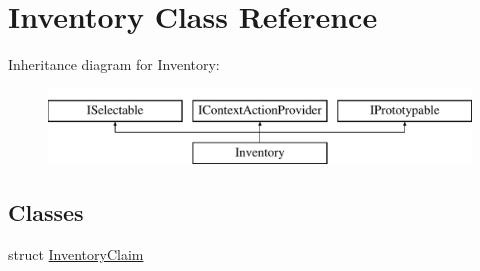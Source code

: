 \hypertarget{class_inventory}{}\section{Inventory Class Reference}
\label{class_inventory}
Inheritance diagram for Inventory\+:\begin{figure}[H]
\begin{center}
\leavevmode
\includegraphics[height=2.000000cm]{class_inventory}
\end{center}
\end{figure}
\subsection*{Classes}
\begin{DoxyCompactItemize}
\item 
struct \hyperlink{struct_inventory_1_1_inventory_claim}{Inventory\+Claim}
\end{DoxyCompactItemize}
